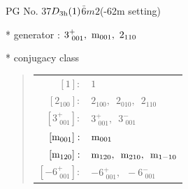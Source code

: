 \documentclass[fleqn,8pt]{jsarticle}
\begin{document}
\setcounter{MaxMatrixCols}{32}

\renewcommand{\tablename}{Table~}
\renewcommand{\figurename}{Figure~}
\begin{center}
\LARGE
PG No. 37\quad$D_{\rm 3h}(1)$\quad$\bar{6}m2$\quad(-62m setting)\quad[ hexagonal ]
\end{center}

* generator : $3^{+}_{\,\,001},\,\,{\rm m}_{001},\,\,2{}_{110}$

* conjugacy class
\begin{quote}
\begin{tabular}{rl}
$ [1]: $ & $ 1 $ \\
$ [2{}_{100}]: $ & $ 2{}_{100},\,\,\,2{}_{010},\,\,\,2{}_{110} $ \\
$ [3^{+}_{\,\,001}]: $ & $ 3^{+}_{\,\,001},\,\,\,3^{-}_{\,\,001} $ \\
$ [{\rm m}_{001}]: $ & $ {\rm m}_{001} $ \\
$ [{\rm m}_{120}]: $ & $ {\rm m}_{120},\,\,\,{\rm m}_{210},\,\,\,{\rm m}_{1-10} $ \\
$ [-6^{+}_{\,\,001}]: $ & $ -6^{+}_{\,\,001},\,\,\,-6^{-}_{\,\,001} $
\end{tabular}
\end{quote}
\end{document}
